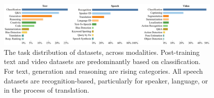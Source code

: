 \begin{figure}[!htb]
    \centering
    \includegraphics[width=\textwidth]{figures/tasks.pdf}
    \caption{The task distribution of datasets, across modalities. Post-training text and video datasets are predominantly based on classification. For text, generation and reasoning are rising categories. All speech datasets are recognition-based, particularly for speaker, language, or in the process of translation.}
    \label{fig:tasks}
\end{figure}